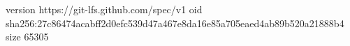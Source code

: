 version https://git-lfs.github.com/spec/v1
oid sha256:27c86474acabff2d0efc539d47a467e8da16e85a705eaed4ab89b520a21888b4
size 65305
